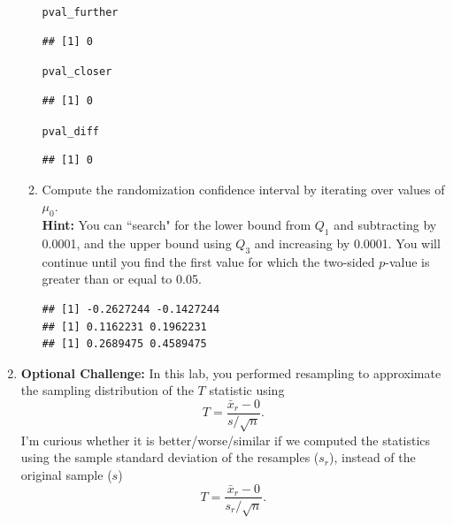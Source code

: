 \documentclass{article}\usepackage[]{graphicx}\usepackage[]{xcolor}
\makeatletter
\newcommand{\hldef}[1]{\textcolor[rgb]{0.345,0.345,0.345}{#1}}%
\newenvironment{kframe}{%
 \def\at@end@of@kframe{}%
 \ifinner\ifhmode%
  \def\at@end@of@kframe{\end{minipage}}%
  \begin{minipage}{\columnwidth}%
 \fi\fi%
 \def\FrameCommand##1{\hskip\@totalleftmargin \hskip-\fboxsep
 \colorbox{shadecolor}{##1}\hskip-\fboxsep
     \hskip-\linewidth \hskip-\@totalleftmargin \hskip\columnwidth}%
 \MakeFramed {\advance\hsize-\width
   \@totalleftmargin\z@ \linewidth\hsize
   \@setminipage}}%
 {\par\unskip\endMakeFramed%
 \at@end@of@kframe}
\newenvironment{knitrout}{}{} %
\makeatother
\begin{document}
\begin{enumerate}
\begin{enumerate}
\begin{knitrout}
\begin{kframe}
\begin{alltt}
\hldef{pval_further}
\end{alltt}
\begin{verbatim}
## [1] 0
\end{verbatim}
\begin{alltt}
\hldef{pval_closer}
\end{alltt}
\begin{verbatim}
## [1] 0
\end{verbatim}
\begin{alltt}
\hldef{pval_diff}
\end{alltt}
\begin{verbatim}
## [1] 0
\end{verbatim}
\end{kframe}
\end{knitrout}
  
  \item Compute the randomization confidence interval by iterating over values of $\mu_0$.\\
  \textbf{Hint:} You can ``search" for the lower bound from $Q_1$ and subtracting by 0.0001, 
  and the upper bound using $Q_3$ and increasing by 0.0001. You will continue until you find 
  the first value for which the two-sided $p$-value is greater than or equal to 0.05.
\begin{knitrout}
\color{fgcolor}\begin{kframe}
\begin{verbatim}
## [1] -0.2627244 -0.1427244
## [1] 0.1162231 0.1962231
## [1] 0.2689475 0.4589475
\end{verbatim}
\end{kframe}
\end{knitrout}
\end{enumerate}
\item \textbf{Optional Challenge:} In this lab, you performed resampling to 
approximate the sampling distribution of the $T$ statistic using
\[T = \frac{\bar{x}_r - 0}{s/\sqrt{n}}.\]
I'm curious whether it is better/worse/similar if we computed the statistics
using the sample standard deviation of the resamples ($s_r$), instead of the 
original sample ($s$)
  \[T = \frac{\bar{x}_r - 0}{s_r/\sqrt{n}}.\]

\end{enumerate}
\end{document}
